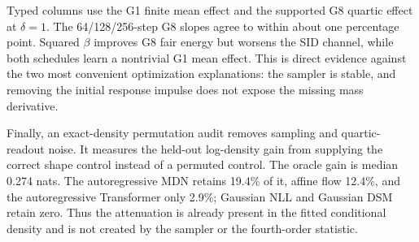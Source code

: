 Typed columns use the G1 finite mean effect and the supported G8 quartic effect at
$\delta=1$.  The 64/128/256-step G8 slopes agree to within about one percentage
point.  Squared $\beta$ improves G8 fair energy but worsens the SID channel, while
both schedules learn a nontrivial G1 mean effect.  This is direct evidence against
the two most convenient optimization explanations: the sampler is stable, and
removing the initial response impulse does not expose the missing mass derivative.

Finally, an exact-density permutation audit removes sampling and quartic-readout
noise.  It measures the held-out log-density gain from supplying the correct
shape control instead of a permuted control.  The oracle gain is median 0.274
nats.  The autoregressive MDN retains 19.4\% of it, affine flow 12.4\%, and the
autoregressive Transformer only 2.9\%; Gaussian NLL and Gaussian DSM retain zero.
Thus the attenuation is already present in the fitted conditional density and is
not created by the sampler or the fourth-order statistic.
